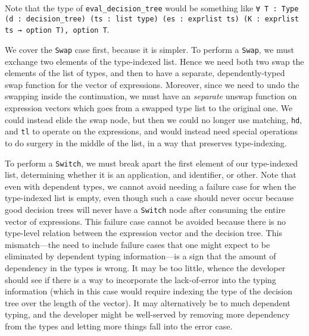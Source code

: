 Note that the type of \texttt{eval_decision_tree} would be something like \texttt{∀ {T : Type} (d : decision_tree) (ts : list type) (es : exprlist ts) (K : exprlist ts → option T), option T}.


We cover the \texttt{Swap} case first, because it is simpler.
To perform a \texttt{Swap}, we must exchange two elements of the type-indexed list.
Hence we need both two swap the elements of the list of types, and then to have a separate, dependently-typed swap function for the vector of expressions.
Moreover, since we need to undo the swapping inside the continuation, we must have an \emph{separate} unswap function on expression vectors which goes from a swapped type list to the original one.
We could instead elide the swap node, but then we could no longer use matching, \texttt{hd}, and \texttt{tl} to operate on the expressions, and would instead need special operations to do surgery in the middle of the list, in a way that preserves type-indexing.

To perform a \texttt{Switch}, we must break apart the first element of our type-indexed list, determining whether it is an application, and identifier, or other.
Note that even with dependent types, we cannot avoid needing a failure case for when the type-indexed list is empty, even though such a case should never occur because good decision trees will never have a \texttt{Switch} node after consuming the entire vector of expressions.
This failure case cannot be avoided because there is no type-level relation between the expression vector and the decision tree.
This mismatch---the need to include failure cases that one might expect to be eliminated by dependent typing information---is a sign that the amount of dependency in the types is wrong.
It may be too little, whence the developer should see if there is a way to incorporate the lack-of-error into the typing information (which in this case would require indexing the type of the decision tree over the length of the vector).
It may alternatively be to much dependent typing, and the developer might be well-served by removing more dependency from the types and letting more things fall into the error case.

